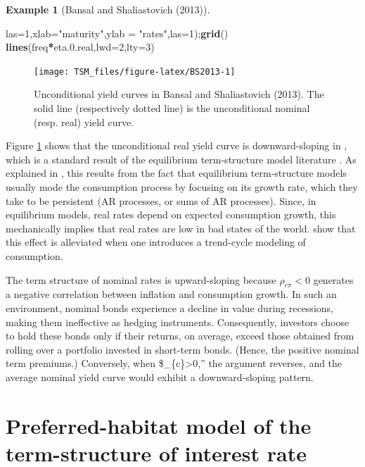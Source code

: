 \documentclass[
  12pt,
]{book}
\newenvironment{Shaded}{\begin{snugshade}}{\end{snugshade}}
\newcommand{\AttributeTok}[1]{\textcolor[rgb]{0.13,0.29,0.53}{#1}}
\newcommand{\DecValTok}[1]{\textcolor[rgb]{0.00,0.00,0.81}{#1}}
\newcommand{\FloatTok}[1]{\textcolor[rgb]{0.00,0.00,0.81}{#1}}
\newcommand{\FunctionTok}[1]{\textcolor[rgb]{0.13,0.29,0.53}{\textbf{#1}}}
\newcommand{\NormalTok}[1]{#1}
\newcommand{\SpecialCharTok}[1]{\textcolor[rgb]{0.81,0.36,0.00}{\textbf{#1}}}
\newcommand{\StringTok}[1]{\textcolor[rgb]{0.31,0.60,0.02}{#1}}
\theoremstyle{definition}
\theoremstyle{definition}
\newtheorem{example}{Example}[chapter]
\theoremstyle{definition}
\theoremstyle{definition}
\theoremstyle{remark}
\begin{document}
\begin{example}[Bansal and Shaliastovich (2013)]
\begin{Shaded}
\begin{Highlighting}[]
     \AttributeTok{las=}\DecValTok{1}\NormalTok{,}\AttributeTok{xlab=}\StringTok{"maturity"}\NormalTok{,}\AttributeTok{ylab =} \StringTok{"rates"}\NormalTok{,}\AttributeTok{las=}\DecValTok{1}\NormalTok{);}\FunctionTok{grid}\NormalTok{()}
\FunctionTok{lines}\NormalTok{(freq}\SpecialCharTok{*}\NormalTok{eta.}\FloatTok{0.}\NormalTok{real,}\AttributeTok{lwd=}\DecValTok{2}\NormalTok{,}\AttributeTok{lty=}\DecValTok{3}\NormalTok{)}
\end{Highlighting}
\end{Shaded}

\begin{figure}
\texttt{[image: TSM\_files/figure-latex/BS2013-1]} \caption{Unconditional yield curves in Bansal and Shaliastovich (2013). The solid line (respectively dotted line) is the unconditional nominal (resp. real) yield curve.}\label{fig:BS2013}
\end{figure}

\end{example}

Figure \ref{fig:BS2013} shows that the unconditional real yield curve is downward-sloping in \citet{Bansal_Shaliastovich_2013}, which is a standard result of the equilibrium term-structure model literature \citep{Piazzesi_Schneider_2007}. As explained in \citet{Bletzinger_Lemke_Renne_2024}, this results from the fact that equilibrium term-structure models usually mode the consumption process by focusing on its growth rate, which they take to be persistent (AR processes, or sums of AR processes). Since, in equilibrium models, real rates depend on expected consumption growth, this mechanically implies that real rates are low in bad states of the world. \citet{Bletzinger_Lemke_Renne_2024} show that this effect is alleviated when one introduces a trend-cycle modeling of consumption.

The term structure of nominal rates is upward-sloping because \(\rho_{c\pi}<0\) generates a negative correlation between inflation and consumption growth. In such an environment, nominal bonds experience a decline in value during recessions, making them ineffective as hedging instruments. Consequently, investors choose to hold these bonds only if their returns, on average, exceed those obtained from rolling over a portfolio invested in short-term bonds. (Hence, the positive nominal term premiums.) Conversely, when \$\rho\_\{c\pi\}\textgreater0,'' the argument reverses, and the average nominal yield curve would exhibit a downward-sloping pattern.

\hypertarget{PHabitat}{%
\section{Preferred-habitat model of the term-structure of interest rate}\label{PHabitat}}
\end{document}
